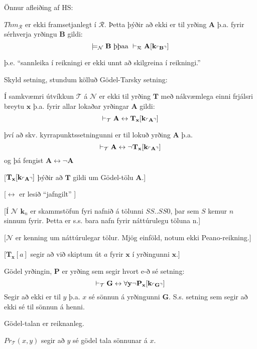 \documentclass[12pt]{book}
\newcommand{\cT}{\mathcal{T}}
\newcommand{\cN}{\mathcal{N}}
\newcommand{\cR}{\mathcal{R}}
\newcommand{\bA}{\mathbf{A}}
\newcommand{\bB}{\mathbf{B}}
\newcommand{\bG}{\mathbf{G}}
\newcommand{\bT}{\mathbf{T}}
\newcommand{\bP}{\mathbf{P}}
\newcommand{\bx}{\mathbf{x}}
\newcommand{\bk}{\mathbf{k}}
\newcommand{\by}{\mathbf{y}}
\newcommand{\vT}{\vdash_{\cT}}
\newcommand{\vR}{\vdash_{\cR}}
\DeclarePairedDelimiter{\god}{\ulcorner}{\urcorner}
\begin{document}
Önnur afleiðing af HS:

\begin{setn}
  $Thm_{\cR}$ er ekki framsetjanlegt í $\cR$.
  Þetta þýðir að ekki er til yrðing $\bA$ þ.a.
  fyrir sérhverja yrðingu $\bB$ gildi:
  \[ \models_{\cN} \bB \text{ þþaa } \vR \bA [\bk_{\god{\bB}}] \]
\end{setn}

þ.e. ``sannleika í reikningi er ekki unnt að skilgreina í reikningi.''

Skyld setning, stundum kölluð Gödel-Tarsky setning:
\begin{setn}
 Í samkvæmri útvíkkun $\cT$ á $\cN$ er ekki til yrðing $\bT$
 með nákvæmlega einni frjálsri breytu $\bx$ þ.a. fyrir allar
 lokaðar yrðingar $\bA$ gildi:
 \[ \vT \bA \leftrightarrow \bT_{\bx}[\bk_{\god{\bA}}]\]


 því að skv. kyrrapunktssetningunni er til lokuð yrðing $\bA$ þ.a.
 \[\vT \bA \leftrightarrow \lnot \bT_{\bx}[\bk_{\god{\bA}}]\]
 og þá fengist $\bA \leftrightarrow \lnot \bA$
 
\end{setn}

\begin{innsk}
  
 [$\bT_{\bx}[\bk_{\god{\bA}}]$ þýðir að $\bT$ gildi um Gödel-tölu $\bA$.]

 [$\leftrightarrow$ er lesið ``jafngilt'' ]

 [Í $\cN$ $\bk_n$ er skammstöfun fyri nafnið á tölunni  $SS..SS0$, þar sem $S$ kemur $n$ sinnum fyrir.
 Þetta er s.s. bara nafn fyrir náttúrulegu töluna n.]

 [$\cN$ er kenning um náttúrulegar tölur. Mjög einföld, notum ekki Peano-reikning.]

 [$\bT_{\bx}[a]$ segir að við skiptum út $a$ fyrir $\bx$ í yrðingunni $\bx$.]

 Gödel yrðingin, $\bP$ er yrðing sem segir hvort e-ð sé setning:
 \[ \vT \bG \leftrightarrow \forall \by \lnot \bP_{\bx} [\bk_{\god{\bG}}] \]
 Segir að ekki er til $y$ þ.a. $x$ sé sönnun á yrðingunni $\bG$.
 S.s. setning sem segir að ekki sé til sönnun á henni.

 Gödel-talan er reiknanleg.


 $Pr_{\cT}(x,y)$ segir að $y$ sé gödel tala sönnunar á $x$.
\end{innsk}
\end{document}
